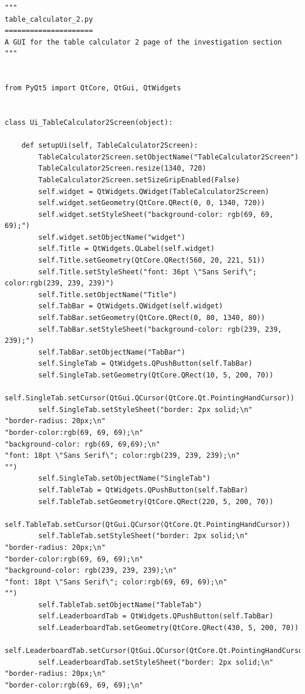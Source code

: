 \documentclass{article}
\begin{document}
\begin{lstlisting}
"""
table_calculator_2.py
=====================
A GUI for the table calculator 2 page of the investigation section
"""


from PyQt5 import QtCore, QtGui, QtWidgets


class Ui_TableCalculator2Screen(object):

    def setupUi(self, TableCalculator2Screen):
        TableCalculator2Screen.setObjectName("TableCalculator2Screen")
        TableCalculator2Screen.resize(1340, 720)
        TableCalculator2Screen.setSizeGripEnabled(False)
        self.widget = QtWidgets.QWidget(TableCalculator2Screen)
        self.widget.setGeometry(QtCore.QRect(0, 0, 1340, 720))
        self.widget.setStyleSheet("background-color: rgb(69, 69, 69);")
        self.widget.setObjectName("widget")
        self.Title = QtWidgets.QLabel(self.widget)
        self.Title.setGeometry(QtCore.QRect(560, 20, 221, 51))
        self.Title.setStyleSheet("font: 36pt \"Sans Serif\"; color:rgb(239, 239, 239)")
        self.Title.setObjectName("Title")
        self.TabBar = QtWidgets.QWidget(self.widget)
        self.TabBar.setGeometry(QtCore.QRect(0, 80, 1340, 80))
        self.TabBar.setStyleSheet("background-color: rgb(239, 239, 239);")
        self.TabBar.setObjectName("TabBar")
        self.SingleTab = QtWidgets.QPushButton(self.TabBar)
        self.SingleTab.setGeometry(QtCore.QRect(10, 5, 200, 70))
        self.SingleTab.setCursor(QtGui.QCursor(QtCore.Qt.PointingHandCursor))
        self.SingleTab.setStyleSheet("border: 2px solid;\n"
"border-radius: 20px;\n"
"border-color:rgb(69, 69, 69);\n"
"background-color: rgb(69, 69,69);\n"
"font: 18pt \"Sans Serif\"; color:rgb(239, 239, 239);\n"
"")
        self.SingleTab.setObjectName("SingleTab")
        self.TableTab = QtWidgets.QPushButton(self.TabBar)
        self.TableTab.setGeometry(QtCore.QRect(220, 5, 200, 70))
        self.TableTab.setCursor(QtGui.QCursor(QtCore.Qt.PointingHandCursor))
        self.TableTab.setStyleSheet("border: 2px solid;\n"
"border-radius: 20px;\n"
"border-color:rgb(69, 69, 69);\n"
"background-color: rgb(239, 239, 239);\n"
"font: 18pt \"Sans Serif\"; color:rgb(69, 69, 69);\n"
"")
        self.TableTab.setObjectName("TableTab")
        self.LeaderboardTab = QtWidgets.QPushButton(self.TabBar)
        self.LeaderboardTab.setGeometry(QtCore.QRect(430, 5, 200, 70))
        self.LeaderboardTab.setCursor(QtGui.QCursor(QtCore.Qt.PointingHandCursor))
        self.LeaderboardTab.setStyleSheet("border: 2px solid;\n"
"border-radius: 20px;\n"
"border-color:rgb(69, 69, 69);\n"

\end{lstlisting}
\end{document}
